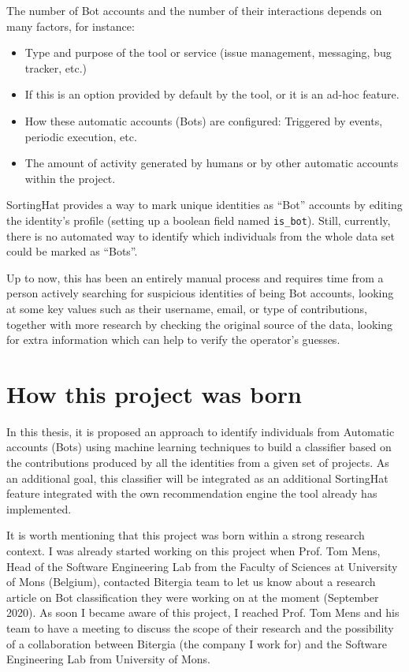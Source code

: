 \documentclass[a4paper, 12pt]{book}
\begin{document}
The number of Bot accounts and the number of their interactions depends on many factors, for instance:
\begin{itemize}
    \item Type and purpose of the tool or service (issue management, messaging, bug tracker, etc.)
    \item If this is an option provided by default by the tool, or it is an ad-hoc feature.
    \item How these automatic accounts (Bots) are configured: Triggered by events, periodic execution, etc.
    \item The amount of activity generated by humans or by other automatic accounts within the project.
\end{itemize}

SortingHat provides a way to mark unique identities as ``Bot'' accounts by editing the identity’s profile (setting up a boolean field named \texttt{is\_bot}). Still, currently, there is no automated way to identify which individuals from the whole data set could be marked as ``Bots''.

Up to now, this has been an entirely manual process and requires time from a person actively searching for suspicious identities of being Bot accounts, looking at some key values such as their username, email, or type of contributions, together with more research by checking the original source of the data, looking for extra information which can help to verify the operator’s guesses.

\section{How this project was born}
\label{sec:intro-project-origin}

In this thesis, it is proposed an approach to identify individuals from Automatic accounts (Bots) using machine learning techniques to build a classifier based on the contributions produced by all the identities from a given set of projects. As an additional goal, this classifier will be integrated as an additional SortingHat feature integrated with the own recommendation engine the tool already has implemented.

It is worth mentioning that this project was born within a strong research context. I was already started working on this project when Prof. Tom Mens, Head of the Software Engineering Lab from the Faculty of Sciences at University of Mons (Belgium), contacted Bitergia team to let us know about a research article on Bot classification they were working on at the moment (September 2020). As soon I became aware of this project, I reached Prof. Tom Mens and his team to have a meeting to discuss the scope of their research and the possibility of a collaboration between Bitergia (the company I work for) and the Software Engineering Lab from University of Mons. 
\end{document}
